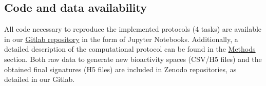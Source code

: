 \subsection{Code and data availability}
\label{Protocols_Code}

All code necessary to reproduce the implemented protocols (4 tasks) are available in our \href{https://gitlabsbnb.irbbarcelona.org/packages/protocols}{Gitlab repository} in the form of Jupyter Notebooks. Additionally, a detailed description of the computational protocol can be found in the \hyperref[Protocols_Methods]{Methods} section. Both raw data to generate new bioactivity spaces (CSV/H5 files) and the obtained final signatures (H5 files) are included in Zenodo repositories, as detailed in our Gitlab. 
